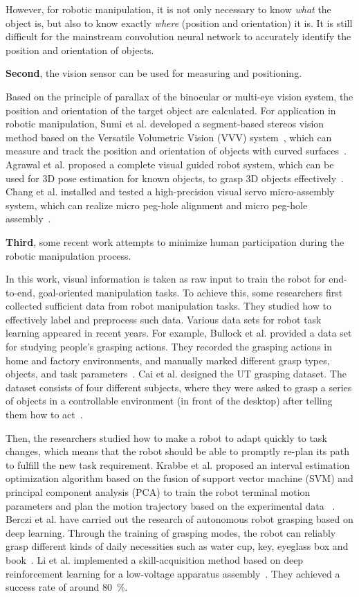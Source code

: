 \documentclass[journal,twoside,web]{ieeecolor}
\begin{document}
However, for robotic manipulation, it is not only necessary to know \textit{what} the object is, but also to know exactly \textit{where} (position and orientation) it is. It is still difficult for the mainstream convolution neural network to accurately identify the position and orientation of objects.

\textbf{Second}, the vision sensor can be used for measuring and positioning. 

Based on the principle of parallax of the binocular or multi-eye vision system, the position and orientation of the target object are calculated. 
For application in robotic manipulation, 
Sumi et al. developed a segment-based stereos vision method based on the Versatile Volumetric Vision (VVV) system~\cite{Tomitaa1998}, which can measure and track the position and orientation of objects with curved surfaces~\cite{Sumi2002Object}.
Agrawal et al. proposed a complete visual guided robot system, which can be used for 3D pose estimation for known objects, to grasp 3D objects effectively~\cite{Agrawal2009Vision}. 
Chang et al. installed and tested a high-precision visual servo micro-assembly system, which can realize micro peg-hole alignment and micro peg-hole assembly~\cite{Chang11}.

\textbf{Third}, some recent work attempts to minimize human participation during the robotic manipulation process. 

In this work, visual information is taken as raw input to train the robot for end-to-end, goal-oriented manipulation tasks.
To achieve this, some researchers first collected sufficient data from robot manipulation tasks. 
They studied how to effectively label and preprocess such data. Various data sets for robot task learning appeared in recent years. 
For example, 
Bullock et al. provided a data set for studying people’s grasping actions. They recorded the grasping actions in home and factory environments, and manually marked different grasp types, objects, and task parameters~\cite{Bullock2015}. 
Cai et al. designed the UT grasping dataset. The dataset consists of four different subjects, where they were asked to grasp a series of objects in a controllable environment (in front of the desktop) after telling them how to act~\cite{Cai2015scalable}.

Then, the researchers studied how to make a robot to adapt quickly to task changes, which means that the robot should be able to promptly re-plan its path to fulfill the new task requirement. 
Krabbe et al. proposed an interval estimation optimization algorithm based on the fusion of support vector machine (SVM) and principal component analysis (PCA) to train the robot terminal motion parameters and plan the motion trajectory based on the experimental data ~\cite{Krabbe2014Autonomous}. 
Berczi et al. have carried out the research of autonomous robot grasping based on deep learning. Through the training of grasping modes, the robot can reliably grasp different kinds of daily necessities such as water cup, key, eyeglass box and book~\cite{Berczi2015Learning}. 
Li et al. implemented a skill-acquisition method based on deep reinforcement learning for a low-voltage apparatus assembly~\cite{Li2019}. They achieved a success rate of around \SI{80}{\percent}.
\end{document}
